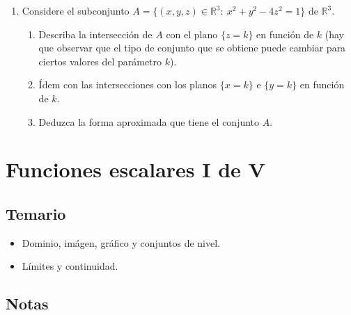 \documentclass[11pt]{book}
\newcommand{\R}{\mathbb{R}}
\theoremstyle{definicion}
\theoremstyle{teorema}
\theoremstyle{ejemplo}
\begin{document}
\begin{enumerate}
\item Considere el subconjunto $A=\{(x,y,z)\in\R^3:\ x^2+y^2-4z^2=1\}$ de $\R^3$.

  \begin{enumerate}
  \item Describa la intersecci\'on de $A$ con el plano $\{z=k\}$ en funci\'on de $k$ (hay que observar que el tipo de conjunto que se obtiene puede cambiar para ciertos valores del parámetro $k$).
\item Ídem con las intersecciones con los planos $\{x=k\}$ e $\{y=k\}$ en funci\'on de $k$.    
\item Deduzca la forma aproximada que tiene el conjunto $A$.
\end{enumerate}

\end{enumerate}


\chapter{Funciones escalares I de V}

\section{Temario} 

\begin{itemize}
    \item Dominio, imágen, gráfico y conjuntos de nivel.
    \item Límites y continuidad.
\end{itemize}

\section{Notas}

\end{document}
